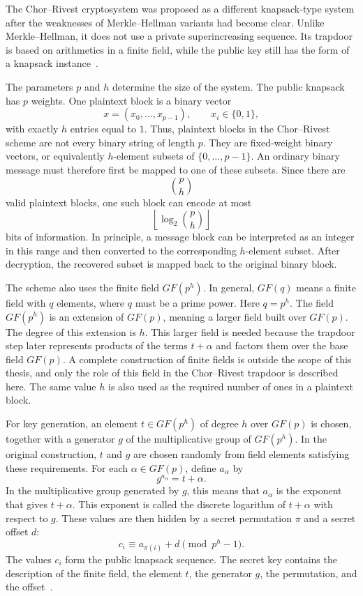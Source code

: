 The Chor--Rivest cryptosystem was proposed as a different knapsack-type system
after the weaknesses of Merkle--Hellman variants had become clear. Unlike
Merkle--Hellman, it does not use a private superincreasing sequence. Its
trapdoor is based on arithmetics in a finite field, while the public key still
has the form of a knapsack instance~\cite{ChorRivest1988}.

The parameters \(p\) and \(h\) determine the size of the system. The public
knapsack has \(p\) weights. One plaintext block is a binary vector
\[
    x=(x_0,\dots,x_{p-1}), \qquad x_i\in\{0,1\},
\]
with exactly \(h\) entries equal to \(1\). Thus, plaintext blocks in the
Chor--Rivest scheme are not every binary string of length \(p\). They are
fixed-weight binary vectors, or equivalently \(h\)-element subsets of
\(\{0,\dots,p-1\}\). An ordinary binary message must therefore first be mapped
to one of these subsets. Since there are
\[
    \binom{p}{h}
\]
valid plaintext blocks, one such block can encode at most
\[
    \left\lfloor \log_2 \binom{p}{h} \right\rfloor
\]
bits of information. In principle, a message block can be interpreted as an
integer in this range and then converted to the corresponding \(h\)-element
subset. After decryption, the recovered subset is mapped back to the original
binary block.

The scheme also uses the finite field \(GF(p^h)\). In general, \(GF(q)\)
means a finite field with \(q\) elements, where \(q\) must be a prime power.
Here \(q=p^h\). The field \(GF(p^h)\) is an extension of \(GF(p)\), meaning a
larger field built over \(GF(p)\). The degree of this extension is \(h\). This
larger field is needed because the trapdoor step later represents products of
the terms \(t+\alpha\) and factors them over the base field \(GF(p)\). A complete
construction of finite fields is outside the scope of this thesis, and only the
role of this field in the Chor--Rivest trapdoor is described here. The same
value \(h\) is also used as the required number of ones in a plaintext block.

For key generation, an element \(t\in GF(p^h)\) of degree \(h\) over \(GF(p)\)
is chosen, together with a generator \(g\) of the multiplicative group of
\(GF(p^h)\). In the original construction, \(t\) and \(g\) are chosen randomly
from field elements satisfying these requirements. For each \(\alpha \in GF(p)\), define \(a_\alpha\) by
\[
    g^{a_\alpha}=t+\alpha.
\]
In the multiplicative group generated by \(g\), this means that \(a_\alpha\) is
the exponent that gives \(t+\alpha\). This exponent is called the discrete
logarithm of \(t+\alpha\) with respect to \(g\). These values are then hidden by a secret permutation \(\pi\) and a
secret offset \(d\):
\[
    c_i \equiv a_{\pi(i)} + d \pmod{p^h-1}.
\]
The values \(c_i\) form the public knapsack sequence. The secret key contains
the description of the finite field, the element \(t\), the generator \(g\), the
permutation, and the offset~\cite{ChorRivest1988}.

